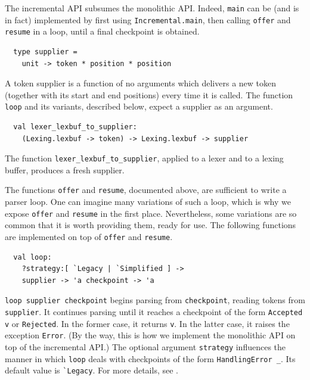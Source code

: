 \documentclass[onecolumn,11pt,nocopyrightspace,preprint]{sigplanconf}
\begin{document}
The incremental API subsumes the monolithic API. Indeed, \verb+main+ can be
(and is in fact) implemented by first using
\verb+Incremental.main+, then calling \verb+offer+ and
\verb+resume+ in a loop, until a final checkpoint is obtained.


\begin{verbatim}
  type supplier =
    unit -> token * position * position
\end{verbatim}

A token supplier is a function of no arguments which delivers a new token
(together with its start and end positions) every time it is called. The
function \verb+loop+ and its variants, described below, expect a supplier
as an argument.


\begin{verbatim}
  val lexer_lexbuf_to_supplier:
    (Lexing.lexbuf -> token) -> Lexing.lexbuf -> supplier
\end{verbatim}

The function \verb+lexer_lexbuf_to_supplier+, applied to a lexer and to a
lexing buffer, produces a fresh supplier.


The functions \verb+offer+ and \verb+resume+, documented above, are sufficient
to write a parser loop. One can imagine many variations of such a loop, which
is why we expose \verb+offer+ and \verb+resume+ in the first place.
Nevertheless, some variations are so common that it is worth providing them,
ready for use. The following functions are implemented on top of \verb+offer+
and \verb+resume+.


\begin{verbatim}
  val loop:
    ?strategy:[ `Legacy | `Simplified ] ->
    supplier -> 'a checkpoint -> 'a
\end{verbatim}

\verb+loop supplier checkpoint+ begins parsing from \verb+checkpoint+, reading
tokens from \verb+supplier+. It continues parsing until it reaches a
checkpoint of the form \verb+Accepted v+ or \verb+Rejected+. In the former
case, it returns \verb+v+. In the latter case, it raises the
exception \verb+Error+. (By the way, this is how we implement the monolithic
API on top of the incremental API.)
%
The optional argument \verb+strategy+ influences the manner in which
\verb+loop+ deals with checkpoints of the form \verb+HandlingError _+. Its
default value is \verb+`Legacy+. For more details, see .
\end{document}
